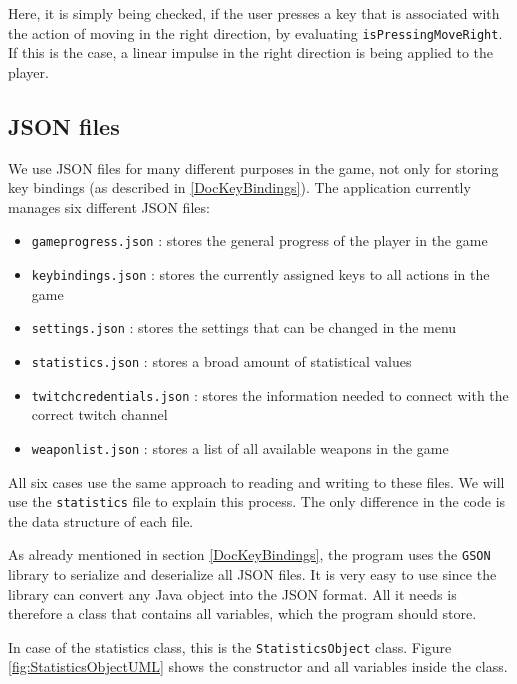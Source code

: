 \documentclass[12p]{article}
\begin{document}
Here, it is simply being checked, if the user presses a key that is associated with the action of moving in the right direction, by evaluating \texttt{isPressingMoveRight}. If this is the case, a linear impulse in the right direction is being applied to the player.


\newpage
\subsection{JSON files} \label{DocJSONfiles}

We use JSON files for many different purposes in the game, not only for storing key bindings (as described in \ref{DocKeyBindings}). The application currently manages six different JSON files: 

\begin{itemize}
  \item[\faFile] \texttt{gameprogress.json} : stores the general progress of the player in the game
  \item[\faFile] \texttt{keybindings.json} : stores the currently assigned keys to all actions in the game
  \item[\faFile] \texttt{settings.json} : stores the settings that can be changed in the menu
  \item[\faFile] \texttt{statistics.json} : stores a broad amount of statistical values
  \item[\faFile] \texttt{twitchcredentials.json} : stores the information needed to connect with the correct twitch channel
  \item[\faFile] \texttt{weaponlist.json} : stores a list of all available weapons in the game
\end{itemize}

All six cases use the same approach to reading and writing to these files. We will use the \texttt{statistics} file to explain this process. The only difference in the code is the data structure of each file.

As already mentioned in section \ref{DocKeyBindings}, the program uses the \texttt{GSON} library to serialize and deserialize all JSON files. It is very easy to use since the library can convert any Java object into the JSON format. All it needs is therefore a class that contains all variables, which the program should store.

In case of the statistics class, this is the \texttt{StatisticsObject} class. Figure \ref{fig:StatisticsObjectUML} shows the constructor and all variables inside the class.
\end{document}
